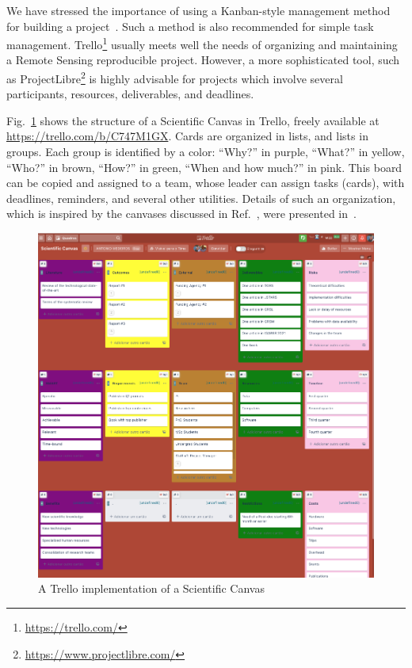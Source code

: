 \documentclass[journal,twoside]{IEEEtran}
\begin{document}
We have stressed the importance of using a Kanban-style management method for building a project~\cite{SuccessfulScientificPublishingfromtheProjecttotheAdvertising}.
Such a method is also recommended for simple task management.
Trello\footnote{\url{https://trello.com/}} usually meets well the needs of organizing and maintaining a Remote Sensing reproducible project. However, a more sophisticated tool, such as ProjectLibre\footnote{\url{https://www.projectlibre.com/}} is highly advisable for projects which involve several participants, resources, deliverables, and deadlines.

Fig.~\ref{Fig:ScientificCanvas} shows the structure of a Scientific Canvas in Trello, freely available at \url{https://trello.com/b/C747M1GX}.
Cards are organized in lists, and lists in groups.
Each group is identified by a color: ``Why?'' in purple,
``What?'' in yellow,
``Who?'' in brown,
``How?'' in green,
``When and how much?'' in pink.
This board can be copied and assigned to a team, whose leader can assign tasks (cards), with deadlines, reminders, and several other utilities.
Details of such an organization, which is inspired by the canvases discussed in Ref.~\cite{osterwalder2010business}, were presented in~\cite{SuccessfulScientificPublishingfromtheProjecttotheAdvertising}.

\begin{figure}[hbt]
	\centering
	\includegraphics[width=\linewidth]{Canvas-Trello-Modelo4}
	\caption{A Trello implementation of a Scientific Canvas}\label{Fig:ScientificCanvas}
\end{figure}
\end{document}
